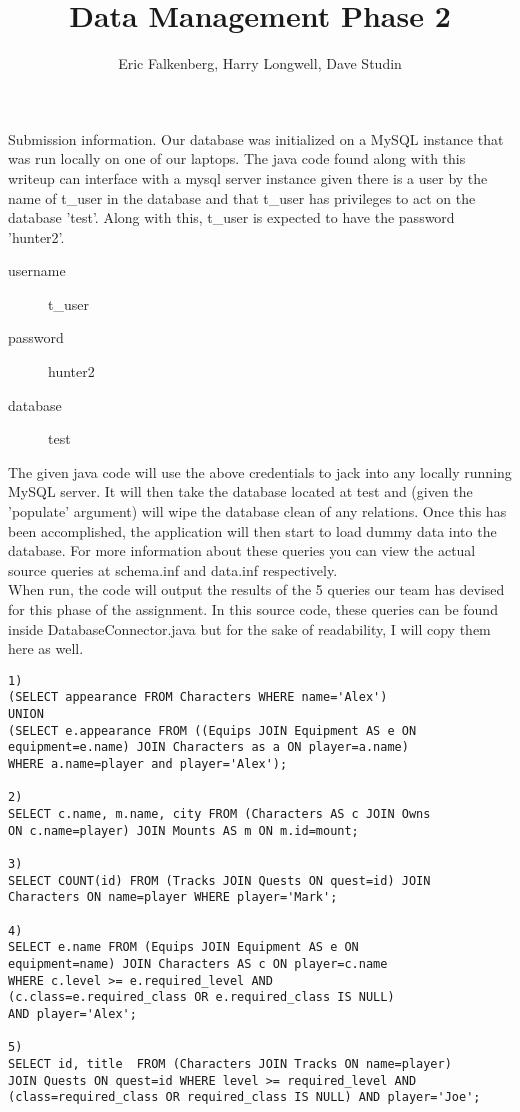 \documentclass[12pt, letterpaper]{article}
\title{Data Management Phase 2}
\author{Eric Falkenberg, Harry Longwell, Dave Studin}
\begin{document}
\maketitle

Submission information. Our database was initialized on a MySQL instance that was run locally on one
of our laptops. The java code found along with this writeup can interface with a mysql server instance
given there is a user by the name of t\_user in the database and that t\_user has privileges to act on the
database 'test'. Along with this, t\_user is expected to have the password 'hunter2'. 

\begin{description}
    \item[username] t\_user
    \item[password] hunter2
    \item[database] test
\end{description}

The given java code will use the above credentials to jack into any locally running MySQL server. It will then
take the database located at test and (given the 'populate' argument) will wipe the database clean of any relations.
Once this has been accomplished, the application will then start to load dummy data into the database. For more information
about these queries you can view the actual source queries at schema.inf and data.inf respectively. \\
When run, the code will output the results of the 5 queries our team has devised for this phase of the assignment. In this source code, these queries can be found inside DatabaseConnector.java but for the sake of readability, I will copy them here as well.
\newpage

\begin{lstlisting}
1)
(SELECT appearance FROM Characters WHERE name='Alex')
UNION
(SELECT e.appearance FROM ((Equips JOIN Equipment AS e ON 
equipment=e.name) JOIN Characters as a ON player=a.name) 
WHERE a.name=player and player='Alex');

2)
SELECT c.name, m.name, city FROM (Characters AS c JOIN Owns 
ON c.name=player) JOIN Mounts AS m ON m.id=mount;

3)
SELECT COUNT(id) FROM (Tracks JOIN Quests ON quest=id) JOIN 
Characters ON name=player WHERE player='Mark';

4)
SELECT e.name FROM (Equips JOIN Equipment AS e ON 
equipment=name) JOIN Characters AS c ON player=c.name 
WHERE c.level >= e.required_level AND 
(c.class=e.required_class OR e.required_class IS NULL) 
AND player='Alex';

5)
SELECT id, title  FROM (Characters JOIN Tracks ON name=player) 
JOIN Quests ON quest=id WHERE level >= required_level AND 
(class=required_class OR required_class IS NULL) AND player='Joe';
\end{lstlisting}
\end{document}
